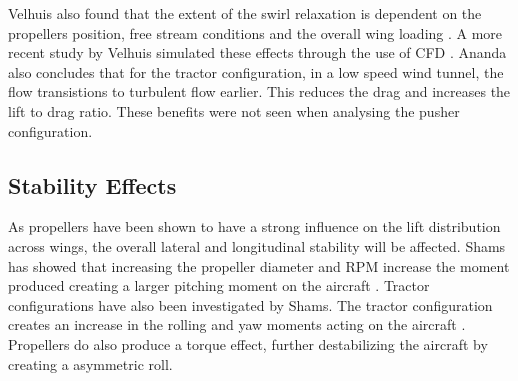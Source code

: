 Velhuis also found that the extent of the swirl relaxation is dependent on the propellers position, free stream conditions and the overall wing loading \cite{Veldhuis2004}. A more recent study by Velhuis simulated these effects through the use of CFD \cite{Veldhuis2016}. Ananda also concludes that for the tractor configuration, in a low speed wind tunnel, the flow transistions to turbulent flow earlier. This reduces the drag and increases the lift to drag ratio. These benefits were not seen when analysing the pusher configuration. 


















\subsection{Stability Effects}
As propellers have been shown to have a strong influence on the lift distribution across wings, the overall lateral and longitudinal stability will be affected. Shams has showed that increasing the propeller diameter and RPM increase the moment produced creating a larger pitching moment on the aircraft \cite{Shams2020}. Tractor configurations have also been investigated by Shams. The tractor configuration creates an increase in the rolling and yaw moments acting on the aircraft \cite{Shams2020}. Propellers do also produce a torque effect, further destabilizing the aircraft by creating a asymmetric roll. 

